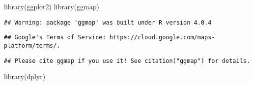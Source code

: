 \documentclass[
]{article}
\newenvironment{Shaded}{\begin{snugshade}}{\end{snugshade}}
\newcommand{\FunctionTok}[1]{\textcolor[rgb]{0.00,0.00,0.00}{#1}}
\newcommand{\NormalTok}[1]{#1}
\begin{document}
\begin{Shaded}
\begin{Highlighting}[]
\FunctionTok{library}\NormalTok{(ggplot2)}
\FunctionTok{library}\NormalTok{(ggmap)}
\end{Highlighting}
\end{Shaded}

\begin{verbatim}
## Warning: package 'ggmap' was built under R version 4.0.4
\end{verbatim}

\begin{verbatim}
## Google's Terms of Service: https://cloud.google.com/maps-platform/terms/.
\end{verbatim}

\begin{verbatim}
## Please cite ggmap if you use it! See citation("ggmap") for details.
\end{verbatim}

\begin{Shaded}
\begin{Highlighting}[]
\FunctionTok{library}\NormalTok{(dplyr)}
\end{Highlighting}
\end{Shaded}
\end{document}
